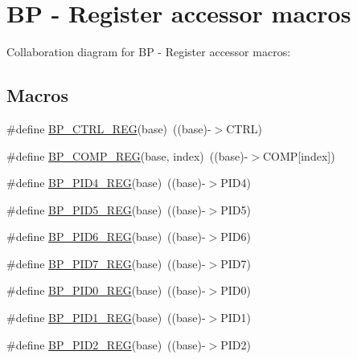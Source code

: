 \hypertarget{group___b_p___register___accessor___macros}{}\section{BP -\/ Register accessor macros}
\label{group___b_p___register___accessor___macros}
Collaboration diagram for BP -\/ Register accessor macros\+:
\subsection*{Macros}
\begin{DoxyCompactItemize}
\item 
\#define \hyperlink{group___b_p___register___accessor___macros_ga263ad2de73c59882ef32b979fbdf85ec}{B\+P\+\_\+\+C\+T\+R\+L\+\_\+\+R\+EG}(base)~((base)-\/$>$C\+T\+RL)
\item 
\#define \hyperlink{group___b_p___register___accessor___macros_gaa003734bc6b716d1723b103a68d560ba}{B\+P\+\_\+\+C\+O\+M\+P\+\_\+\+R\+EG}(base,  index)~((base)-\/$>$C\+O\+MP\mbox{[}index\mbox{]})
\item 
\#define \hyperlink{group___b_p___register___accessor___macros_ga28db243373ee0ff2f420aca1d10355af}{B\+P\+\_\+\+P\+I\+D4\+\_\+\+R\+EG}(base)~((base)-\/$>$P\+I\+D4)
\item 
\#define \hyperlink{group___b_p___register___accessor___macros_ga2345dbb37bdbd60923585d262577046e}{B\+P\+\_\+\+P\+I\+D5\+\_\+\+R\+EG}(base)~((base)-\/$>$P\+I\+D5)
\item 
\#define \hyperlink{group___b_p___register___accessor___macros_ga66703003db17abee9bb72bd7ffcd9c35}{B\+P\+\_\+\+P\+I\+D6\+\_\+\+R\+EG}(base)~((base)-\/$>$P\+I\+D6)
\item 
\#define \hyperlink{group___b_p___register___accessor___macros_gaf7dbebc14a63b88e16cbef163a2f4f45}{B\+P\+\_\+\+P\+I\+D7\+\_\+\+R\+EG}(base)~((base)-\/$>$P\+I\+D7)
\item 
\#define \hyperlink{group___b_p___register___accessor___macros_ga2032a6a90cc64bed6f7ec68fe77223f3}{B\+P\+\_\+\+P\+I\+D0\+\_\+\+R\+EG}(base)~((base)-\/$>$P\+I\+D0)
\item 
\#define \hyperlink{group___b_p___register___accessor___macros_ga21ce329732a15c5f3baf04a997a24d2a}{B\+P\+\_\+\+P\+I\+D1\+\_\+\+R\+EG}(base)~((base)-\/$>$P\+I\+D1)
\item 
\#define \hyperlink{group___b_p___register___accessor___macros_ga2b3d9f17484a035c220a1d5ac090e523}{B\+P\+\_\+\+P\+I\+D2\+\_\+\+R\+EG}(base)~((base)-\/$>$P\+I\+D2)

\end{DoxyCompactItemize}

